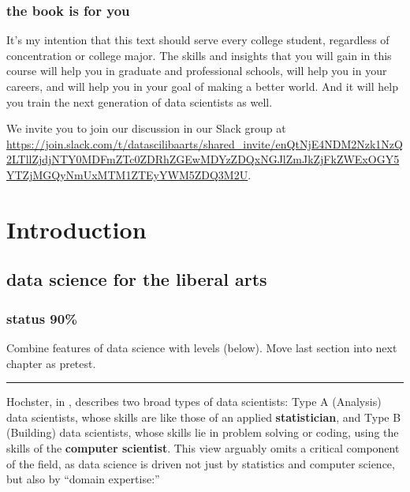 \documentclass[
  openany]{book}
\begin{document}
\hypertarget{the-book-is-for-you}{%
\section*{the book is for you}\label{the-book-is-for-you}}

It's my intention that this text should serve every college student, regardless of concentration or college major. The skills and insights that you will gain in this course will help you in graduate and professional schools, will help you in your careers, and will help you in your goal of making a better world. And it will help you train the next generation of data scientists as well.

We invite you to join our discussion in our Slack group at \url{https://join.slack.com/t/datascilibaarts/shared_invite/enQtNjE4NDM2Nzk1NzQ2LTllZjdjNTY0MDFmZTc0ZDRhZGEwMDYzZDQxNGJlZmJkZjFkZWExOGY5YTZjMGQyNmUxMTM1ZTEyYWM5ZDQ3M2U}.

\hypertarget{part-introduction}{%
\part{Introduction}\label{part-introduction}}

\hypertarget{data-science-for-the-liberal-arts}{%
\chapter{data science for the liberal arts}\label{data-science-for-the-liberal-arts}}

\hypertarget{status-90}{%
\section*{status 90\%}\label{status-90}}

Combine features of data science with levels (below). Move last section into next chapter as pretest.

\begin{center}\rule{0.5\linewidth}{\linethickness}\end{center}

Hochster, in \citet{hicks2017guide}, describes two broad types of data scientists: Type A (Analysis) data scientists, whose skills are like those of an applied \textbf{statistician}, and Type B (Building) data scientists, whose skills lie in problem solving or coding, using the skills of the \textbf{computer scientist}. This view arguably omits a critical component of the field, as data science is driven not just by statistics and computer science, but also by ``domain expertise:''
\end{document}
